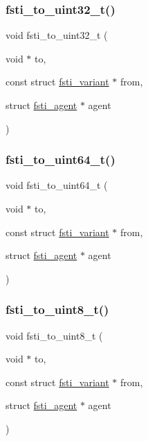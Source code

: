 \subsubsection{\texorpdfstring{fsti\+\_\+to\+\_\+uint32\+\_\+t()}{fsti\_to\_uint32\_t()}}
{\footnotesize\ttfamily void fsti\+\_\+to\+\_\+uint32\+\_\+t (\begin{DoxyParamCaption}\item[{void $\ast$}]{to,  }\item[{const struct \mbox{\hyperlink{structfsti__variant}{fsti\+\_\+variant}} $\ast$}]{from,  }\item[{struct \mbox{\hyperlink{structfsti__agent}{fsti\+\_\+agent}} $\ast$}]{agent }\end{DoxyParamCaption})}

\mbox{\label{fsti-events_8c_a964cff2ca16ac067e90708b2f04f7098}} 
\subsubsection{\texorpdfstring{fsti\+\_\+to\+\_\+uint64\+\_\+t()}{fsti\_to\_uint64\_t()}}
{\footnotesize\ttfamily void fsti\+\_\+to\+\_\+uint64\+\_\+t (\begin{DoxyParamCaption}\item[{void $\ast$}]{to,  }\item[{const struct \mbox{\hyperlink{structfsti__variant}{fsti\+\_\+variant}} $\ast$}]{from,  }\item[{struct \mbox{\hyperlink{structfsti__agent}{fsti\+\_\+agent}} $\ast$}]{agent }\end{DoxyParamCaption})}

\mbox{\label{fsti-events_8c_ae35be4fced1f9a93476a536b20332478}} 
\subsubsection{\texorpdfstring{fsti\+\_\+to\+\_\+uint8\+\_\+t()}{fsti\_to\_uint8\_t()}}
{\footnotesize\ttfamily void fsti\+\_\+to\+\_\+uint8\+\_\+t (\begin{DoxyParamCaption}\item[{void $\ast$}]{to,  }\item[{const struct \mbox{\hyperlink{structfsti__variant}{fsti\+\_\+variant}} $\ast$}]{from,  }\item[{struct \mbox{\hyperlink{structfsti__agent}{fsti\+\_\+agent}} $\ast$}]{agent }\end{DoxyParamCaption})}

